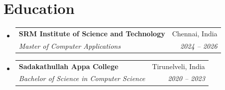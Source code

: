 \documentclass[letterpaper,10pt]{article}
\makeatletter
\newcommand{\resumeSubheading}[4]{
  \vspace{-2pt}\item
    \begin{tabular*}{0.97\textwidth}[t]{l@{\extracolsep{\fill}}r}
      \textbf{#1} & #2 \\
      \textit{\small#3} & \textit{\small #4} \\
    \end{tabular*}\vspace{-7pt}
}
\newcommand{\resumeSubHeadingListStart}{\begin{itemize}[leftmargin=0.15in, label={}]}
\newcommand{\resumeSubHeadingListEnd}{\end{itemize}}
\makeatother
\begin{document}
\section{Education}
  \resumeSubHeadingListStart
    \resumeSubheading
      {SRM Institute of Science and Technology}{Chennai, India}
      {Master of Computer Applications}{2024 -- 2026}
    \resumeSubheading
      {Sadakathullah Appa College}{Tirunelveli, India}
      {Bachelor of Science in Computer Science}{2020 -- 2023}
  \resumeSubHeadingListEnd

\end{document}
